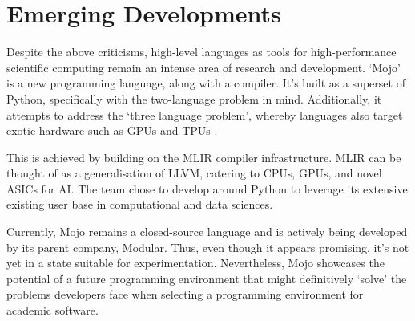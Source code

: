 \section{Emerging Developments}\label{chpt:1:sec:3}

Despite the above criticisms, high-level languages as tools for high-performance scientific computing remain an intense area of research and development. `Mojo' is a new programming language, along with a compiler. It's built as a superset of Python, specifically with the two-language problem in mind. Additionally, it attempts to address the `three language problem', whereby languages also target exotic hardware such as GPUs and TPUs \cite{Lattner2023Mojo}.
    
This is achieved by building on the MLIR compiler infrastructure. MLIR can be thought of as a generalisation of LLVM, catering to CPUs, GPUs, and novel ASICs for AI. The team chose to develop around Python to leverage its extensive existing user base in computational and data sciences.

Currently, Mojo remains a closed-source language and is actively being developed by its parent company, Modular. Thus, even though it appears promising, it's not yet in a state suitable for experimentation. Nevertheless, Mojo showcases the potential of a future programming environment that might definitively `solve' the problems developers face when selecting a programming environment for academic software.